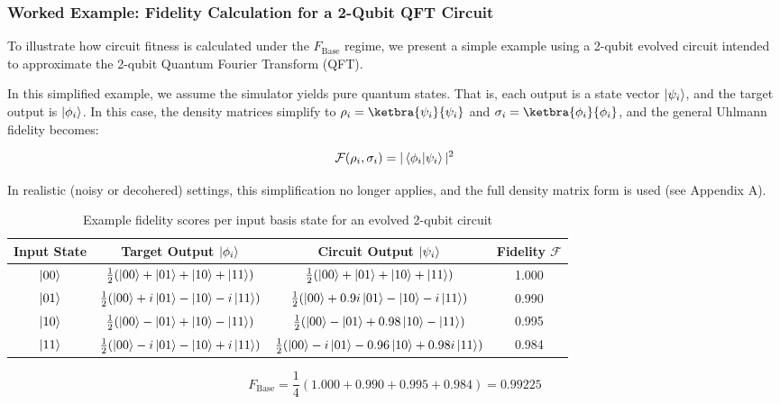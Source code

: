 \documentclass[11pt,a4paper]{article}
\begin{document}
\subsubsection*{Worked Example: Fidelity Calculation for a 2-Qubit QFT Circuit}
To illustrate how circuit fitness is calculated under the $F_{\mathrm{Base}}$ regime, we present a simple example using a 2-qubit evolved circuit intended to approximate the 2-qubit Quantum Fourier Transform (QFT).\newline

In this simplified example, we assume the simulator yields pure quantum states. That is, each output is a state vector $\ket{\psi_i}$, and the target output is $\ket{\phi_i}$. In this case, the density matrices simplify to $\rho_i = \ketbra{\psi_i}{\psi_i}$ and $\sigma_i = \ketbra{\phi_i}{\phi_i}$, and the general Uhlmann fidelity\cite{marian2012uhlmann} becomes:

\[
\mathcal{F}(\rho_i, \sigma_i) = |\braket{\phi_i | \psi_i}|^2
\]

In realistic (noisy or decohered) settings, this simplification no longer applies, and the full density matrix form is used (see Appendix A).

\begin{table}[H]
\centering
\small
\begin{tabular}{c|c|c|c}
\toprule
\textbf{Input State} & \textbf{Target Output} $\ket{\phi_i}$ & \textbf{Circuit Output} $\ket{\psi_i}$ & \textbf{Fidelity} $\mathcal{F}$ \\
\midrule
$\ket{00}$ & $\frac{1}{2}(\ket{00} + \ket{01} + \ket{10} + \ket{11})$ & $\frac{1}{2}(\ket{00} + \ket{01} + \ket{10} + \ket{11})$ & 1.000 \\
$\ket{01}$ & $\frac{1}{2}(\ket{00} + i\ket{01} - \ket{10} - i\ket{11})$ & $\frac{1}{2}(\ket{00} + 0.9i\ket{01} - \ket{10} - i\ket{11})$ & 0.990 \\
$\ket{10}$ & $\frac{1}{2}(\ket{00} - \ket{01} + \ket{10} - \ket{11})$ & $\frac{1}{2}(\ket{00} - \ket{01} + 0.98\ket{10} - \ket{11})$ & 0.995 \\
$\ket{11}$ & $\frac{1}{2}(\ket{00} - i\ket{01} - \ket{10} + i\ket{11})$ & $\frac{1}{2}(\ket{00} - i\ket{01} - 0.96\ket{10} + 0.98i\ket{11})$ & 0.984 \\
\bottomrule
\end{tabular}
\caption{Example fidelity scores per input basis state for an evolved 2-qubit circuit}
\label{tab:fidelity_example}
\end{table}

\[
F_{\mathrm{Base}} = \frac{1}{4} (1.000 + 0.990 + 0.995 + 0.984) = 0.99225
\]
\end{document}
